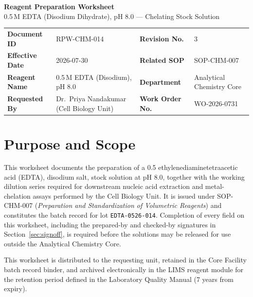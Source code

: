 \begin{tcolorbox}[enhanced, colback=labteal, colframe=labteal, coltext=white,
  boxrule=0pt, sharp corners, left=14pt, right=14pt, top=10pt, bottom=10pt]
{\Huge\bfseries Reagent Preparation Worksheet}\\[4pt]
{\large 0.5\,M EDTA (Disodium Dihydrate), pH 8.0 --- Chelating Stock Solution}
\end{tcolorbox}

\vspace{6pt}

\begin{tabularx}{\textwidth}{@{}lXlX@{}}
\toprule
\textbf{Document ID} & RPW-CHM-014 & \textbf{Revision No.} & 3 \\
\textbf{Effective Date} & 2026-07-30 & \textbf{Related SOP} & SOP-CHM-007 \\
\textbf{Reagent Name} & 0.5\,M EDTA (Disodium), pH 8.0 & \textbf{Department} & Analytical Chemistry Core \\
\textbf{Requested By} & Dr.\ Priya Nandakumar (Cell Biology Unit) & \textbf{Work Order No.} & WO-2026-0731 \\
\bottomrule
\end{tabularx}

\section{Purpose and Scope}
\label{sec:doccontrol}

This worksheet documents the preparation of a \SI{0.5}{\Molar} ethylenediaminetetraacetic
acid (EDTA), disodium salt, stock solution at pH 8.0, together with the working dilution
series required for downstream nucleic acid extraction and metal-chelation assays performed
by the Cell Biology Unit. It is issued under SOP-CHM-007 (\emph{Preparation and
Standardization of Volumetric Reagents}) and constitutes the batch record for lot
\texttt{EDTA-0526-014}. Completion of every field on this worksheet, including the
prepared-by and checked-by signatures in Section~\ref{sec:signoff}, is required before the
solutions may be released for use outside the Analytical Chemistry Core.

This worksheet is distributed to the requesting unit, retained in the Core Facility batch
record binder, and archived electronically in the LIMS reagent module for the retention
period defined in the Laboratory Quality Manual (7 years from expiry).

